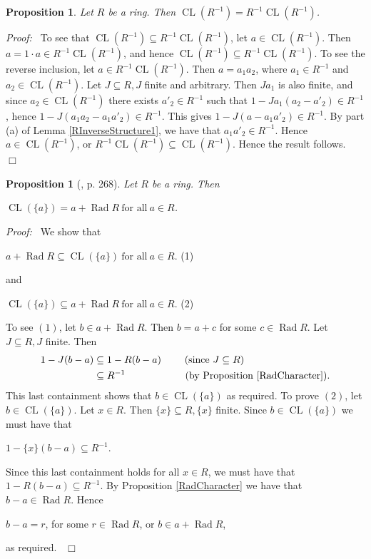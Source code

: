 \documentclass[12pt, oneside]{book}
\newtheorem{proposition}[theorem]{Proposition}
\newcommand{\proof}{{\noindent \it Proof:~}}
\newcommand{\qed}{\hfill ~$\Box$\\}
\def\Rad{\operatorname{Rad}}
\def\CL{\operatorname{CL}}
\begin{document}
\begin{proposition} \label{InvertiblesTimesClosure}
\normalfont
\noindent Let $R$ be a ring. Then $\CL(R^{-1}) = R^{-1}\CL(R^{-1})$.
\end{proposition}
\proof \space
To see that $\CL(R^{-1}) \subseteq R^{-1}\CL(R^{-1})$, let $a \in \CL(R^{-1})$. 
Then $a = 1\cdot a \in R^{-1}\CL(R^{-1})$, and hence $\CL(R^{-1}) \subseteq R^{-1}\CL(R^{-1})$.
\vskip 0.3cm
\noindent To see the reverse inclusion, let $a \in R^{-1}\CL(R^{-1})$. 
Then $a = a_1 a_2$, where $a_1 \in R^{-1}$ and $a_2 \in \CL(R^{-1})$. 
Let $J \subseteq R, J$ finite 
and arbitrary. Then $Ja_1$ is also finite, and since $a_2 \in \CL(R^{-1})$ there exists 
$a'_2 \in R^{-1}$ such that $1 - Ja_1(a_2 - a'_2) \in R^{-1}$, hence 
$1 - J(a_1a_2 - a_1a'_2) \in R^{-1}$. This gives
$1 - J(a - a_1a'_2) \in R^{-1}$. By part (a) of Lemma \ref{RInverseStructure1}, we have that 
$a_1a'_2 \in R^{-1}$. Hence $a \in \CL(R^{-1})$, or  $R^{-1}\CL(R^{-1}) \subseteq \CL(R^{-1})$. 
Hence the result follows.
\qed

\begin{proposition}[\cite{CH3}, p. 268] \label{closureOfSingleton}
\normalfont
Let $R$ be a ring. Then 
\begin{center}
$\CL(\{a\})=a+\Rad R\ \text{for all}\ a \in R$.
\end{center}

\end{proposition}

\proof \space 
We show that 
\begin{center}
$ a+\Rad R \subseteq \CL(\{a\}) \ \text{for all}\ a \in R$. \hfill(1)
\end{center}
and 
\begin{center}
$\CL(\{a\}) \subseteq a+\Rad R\ \text{for all}\ a \in R$. \hfill(2)
\end{center}
\noindent To see $(1)$, let $b \in a+\Rad R.$ Then $b = a + c$ for some 
$c \in \Rad R$. Let $J \subseteq R, J$ finite. Then
\begin{align*}
1 - J(b - a) &\subseteq 1 - R(b - a) \qquad \ (\text{since $J \subseteq R)$}\\
&\subseteq R^{-1} \qquad \qquad \qquad (\text{by Proposition \ref{RadCharacter}}).
\end{align*}
This last containment shows that $b \in \CL(\{a\})$ as required.
\vskip 0.3cm
\noindent To prove $(2)$, let $b \in \CL(\{a\}).$ Let $x \in R$. Then $\{x\} \subseteq R, \{x\}$ finite.
Since $b \in \CL(\{a\})$ we must have that
\begin{center}
$1 - \{x \} (b - a) \subseteq R^{-1}$.
\end{center}
\noindent Since this last containment holds for all $x \in R$, 
we must have that $1 - R(b - a) \subseteq R^{-1}$.  By Proposition \ref{RadCharacter} we have that $b - a \in \Rad R$. Hence
 \begin{center}
 $b - a = r$, for some $r \in \Rad R$, or $b \in a + \Rad R$,
 \end{center}
 as required.
\noindent \qed
\end{document}
